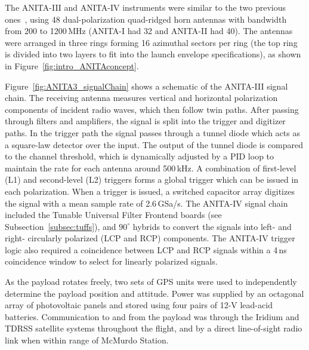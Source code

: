 The ANITA-III and ANITA-IV instruments were similar to the two previous
ones~\cite{ANITA1paper,ANITA2paper}, using 48 dual-polarization quad-ridged horn antennas with bandwidth from 200 to 1200\,MHz (ANITA-I had 32 and ANITA-II had 40). 
The antennas were arranged in three rings forming 16 azimuthal sectors per ring (the top ring is divided into two layers to fit into the launch envelope specifications), as shown in Figure~\ref{fig:intro_ANITAconcept}.

Figure~\ref{fig:ANITA3_signalChain} shows a schematic of the ANITA-III signal chain. 
The receiving antenna measures vertical and horizontal polarization components of incident radio waves, which then follow twin paths. 
After passing through filters and amplifiers, the signal is split into
the trigger and digitizer paths.
In the trigger path the signal passes
through a tunnel diode which acts as a square-law detector over the
input. The output of the tunnel diode is compared to the channel
threshold, which is dynamically adjusted by a PID loop to maintain the
rate for each antenna around 500\,kHz. A combination of first-level (L1) and second-level (L2) triggers forms a
global trigger which can be issued in each polarization.
When a trigger is issued, a switched capacitor array digitizes the signal with a mean sample rate of 2.6\,GSa/s. 
The ANITA-IV signal chain included the Tunable Universal Filter Frontend boards (see Subsection~\ref{subsec:tuffs}), and $90^{\circ}$ hybrids to convert the signals into left- and right- circularly polarized (LCP and RCP) components. 
The ANITA-IV trigger logic also required a coincidence between LCP and RCP signals within a 4\,ns coincidence window to select for linearly polarized signals. 

As the payload rotates freely, two sets of GPS units were used to independently determine the
payload position and attitude.
Power was supplied by an octagonal array of photovoltaic panels and stored using four pairs of 12-V lead-acid batteries.
Communication to and from the payload was through the Iridium and TDRSS satellite systems throughout the flight, and by a direct line-of-sight radio link when within range of McMurdo Station.


